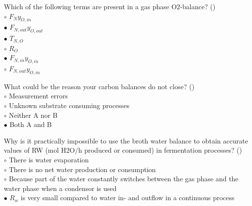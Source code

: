 \documentclass[]{beamer}
\begin{document}
\begin{frame}[shrink] {}
\addtocounter{questions}{1}
\color{blue}
Which of the following terms are present in a gas phase O2-balance?  ()\\
\color{black}
\setlength{\parindent}{-0.4cm}
{\color{red}$\circ$}   $F_{N}y_{O,in}$\\   
{\color{red}$\bullet$}   $F_{N,out}y_{O,out}$\\   
{\color{red}$\bullet$} $T_{N,O}$\\
{\color{red}$\circ$} $R_O$\\
{\color{red}$\bullet$}   $F_{N,in}y_{O,in}$  \\ 
{\color{red}$\circ$}   $F_{N,out}y_{O,in}$   
\end{frame}

\begin{frame}[shrink] {}
\addtocounter{questions}{1}
\color{blue}
What could be the reason your carbon balances do not close?  ()\\
\color{black}
\setlength{\parindent}{-0.4cm}
{\color{red}$\circ$}    Measurement errors\\
{\color{red}$\circ$} Unknown substrate consuming processes\\
{\color{red}$\circ$} Neither A nor B \\
{\color{red}$\bullet$} Both A and B   \\
\end{frame}

\begin{frame}[shrink] {}
\addtocounter{questions}{1}
\color{blue}
Why is it practically impossible to use the broth water balance to obtain accurate values of RW (mol H2O/h produced or consumed) in fermentation processes?  ()\\
\color{black}
\setlength{\parindent}{-0.4cm}
{\color{red}$\circ$}    There is water evaporation\\
{\color{red}$\circ$} There is no net water production or consumption  \\
{\color{red}$\circ$} Because part of the water constantly switches between the gas phase and the water phase when a condensor is used \\
{\color{red}$\bullet$} $R_w$ is very small compared to water in- and outflow in a continuous process   
\end{frame}
\end{document}
